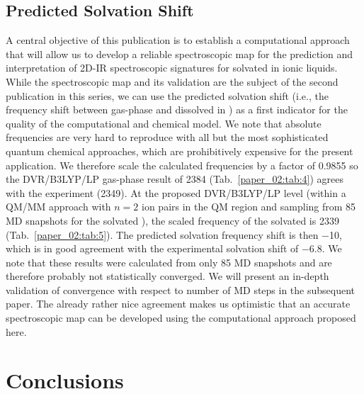 \subsection{Predicted Solvation Shift}
\label{paper_02:ssec:IIIF}

A central objective of this publication is to establish a computational approach that will allow us to develop a reliable spectroscopic map for the prediction and interpretation of 2D-IR spectroscopic signatures for  solvated in ionic liquids. While the spectroscopic map and its validation are the subject of the second publication in this series, we can use the predicted solvation shift (i.e., the frequency shift between gas-phase  and dissolved in \ce{[C4C1im][PF6]}) as a first indicator for the quality of the computational and chemical model. We note that absolute frequencies are very hard to reproduce with all but the most sophisticated quantum chemical approaches, which are prohibitively expensive for the present application. We therefore scale the calculated frequencies by a factor of \num{0.9855} so the DVR/B3LYP/LP gas-phase result of \SI{2384}{\wavenumber} (Tab.~\ref{paper_02:tab:4}) agrees with the experiment (\SI{2349}{\wavenumber}). At the proposed DVR/B3LYP/LP level (within a QM/MM approach with \(n = 2\) ion pairs in the QM region and sampling from \num{85} MD snapshots for the solvated ), the scaled frequency of the solvated  is \SI{2339}{\wavenumber} (Tab.~\ref{paper_02:tab:5}). The predicted solvation frequency shift is then \SI{-10}{\wavenumber}, which is in good agreement with the experimental solvation shift of \SI{-6.8}{\wavenumber}. We note that these results were calculated from only \num{85} MD snapshots and are therefore probably not statistically converged. We will present an in-depth validation of convergence with respect to number of MD steps in the subsequent paper. The already rather nice agreement makes us optimistic that an accurate spectroscopic map can be developed using the computational approach proposed here.

\section{Conclusions}
\label{paper_02:sec:IV}


